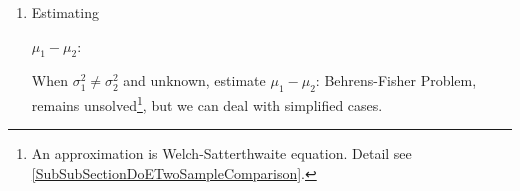 \begin{enumerate}
    

    \begin{enumerate}[topsep=2pt,itemsep=2pt]
        \item \hypertarget{TwoSampletTest}{Estimating} $\mu_1-\mu_2$:
    
        When $\sigma_1^2\neq\sigma^2_2$ and unknown, estimate $\mu_1-\mu_2$: Behrens-Fisher Problem, remains unsolved\footnote{An approximation is Welch-Satterthwaite equation. Detail see \autoref{SubSubSectionDoETwoSampleComparison}.}, but we can deal with simplified cases. 


\end{enumerate}
\end{enumerate}
